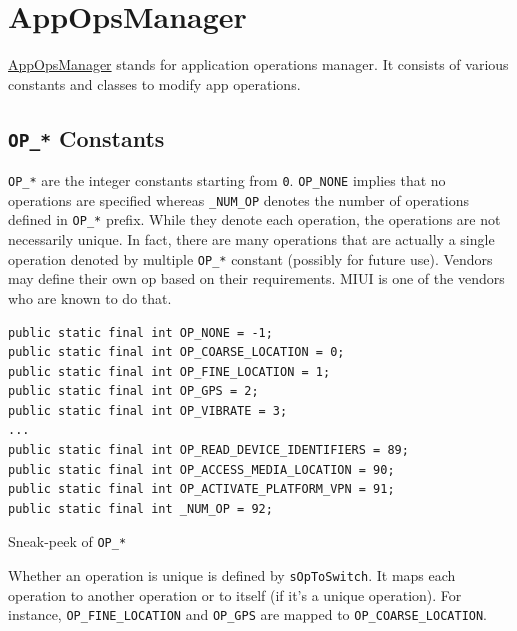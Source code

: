 \section{AppOpsManager}\label{sec:appopsmanager} %
\href{https://android.googlesource.com/platform/frameworks/base/+/master/core/java/android/app/AppOpsManager.java}{AppOpsManager}
stands for application operations manager. It consists of various constants and classes to modify app operations.


\subsection{\texttt{OP\_*} Constants}\label{subsec:op-constants} %
\texttt{OP\_*} are the integer constants starting from \texttt{0}. \texttt{OP\_NONE} implies that no operations are
specified whereas \texttt{\_NUM\_OP} denotes the number of operations defined in \texttt{OP\_*} prefix. While they
denote each operation, the operations are not necessarily unique. In fact, there are many operations that are actually
a single operation denoted by multiple \texttt{OP\_*} constant (possibly for future use). Vendors may define their own
op based on their requirements. MIUI is one of the vendors who are known to do that.

\begin{listing}[ht]
    \begin{verbatim}
public static final int OP_NONE = -1;
public static final int OP_COARSE_LOCATION = 0;
public static final int OP_FINE_LOCATION = 1;
public static final int OP_GPS = 2;
public static final int OP_VIBRATE = 3;
...
public static final int OP_READ_DEVICE_IDENTIFIERS = 89;
public static final int OP_ACCESS_MEDIA_LOCATION = 90;
public static final int OP_ACTIVATE_PLATFORM_VPN = 91;
public static final int _NUM_OP = 92;
    \end{verbatim}
    \caption{Sneak-peek of \texttt{OP\_*}} %
    \label{lst:op-constants}
\end{listing}

Whether an operation is unique is defined by \texttt{sOpToSwitch}.
It maps each operation to another operation or to itself (if it's a unique operation).
For instance, \texttt{OP\_FINE\_LOCATION} and \texttt{OP\_GPS} are mapped to \texttt{OP\_COARSE\_LOCATION}.

